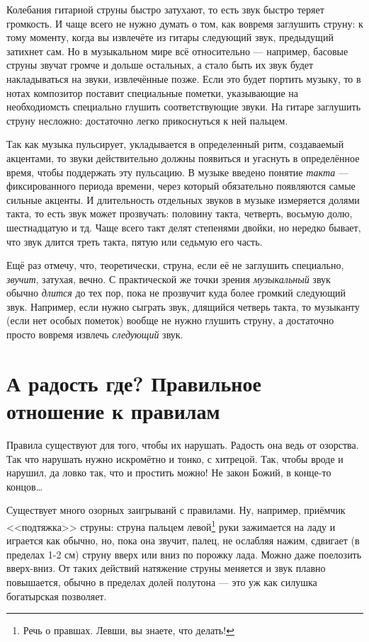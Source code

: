Колебания гитарной струны быстро затухают, то есть звук быстро теряет громкость. И чаще всего не нужно думать о том, как вовремя заглушить струну: к тому моменту, когда вы извлечёте из гитары следующий звук, предыдущий затихнет сам. Но в музыкальном мире всё относительно --- например, басовые струны звучат громче и дольше остальных, а стало быть их звук будет накладываться на звуки, извлечённые позже. Если это будет портить музыку, то в нотах композитор поставит специальные пометки, указывающие на необходиомсть специально глушить соответствующие звуки. На гитаре заглушить струну несложно: достаточно легко прикоснуться к ней пальцем.

Так как музыка пульсирует, укладывается в определенный ритм, создаваемый акцентами, то звуки действительно должны появиться и угаснуть в определённое время, чтобы поддержать эту пульсацию. В музыке введено понятие \emph{такта} --- фиксированного периода времени, через который обязательно появляются самые сильные акценты. И длительность отдельных звуков в музыке измеряется долями такта, то есть звук может прозвучать: половину такта, четверть, восьмую долю, шестнадцатую и тд. Чаще всего такт делят степенями двойки, но нередко бывает, что звук длится треть такта, пятую или седьмую его часть.

Ещё раз отмечу, что, теоретически, струна, если её не заглушить специально, \emph{звучит}, затухая, вечно. С практической же точки зрения \emph{музыкальный} звук обычно \emph{длится} до тех пор, пока не прозвучит куда более громкий следующий звук. Например, если нужно сыграть звук, длящийся четверь такта, то музыканту (если нет особых пометок) вообще не нужно глушить струну, а достаточно просто вовремя извлечь \emph{следующий} звук.


\section{А радость где? Правильное отношение к правилам}
\label{ch:music:rules}

Правила существуют для того, чтобы их нарушать. Радость она ведь от озорства. Так что нарушать нужно искромётно и тонко, с хитрецой. Так, чтобы вроде и нарушил, да ловко так, что и простить можно! Не закон Божий, в конце-то концов\ldots

Существует много озорных заигрыванй с правилами. Ну, например, приёмчик <<подтяжка>> струны: струна пальцем левой\footnote{Речь о правшах. Левши, вы знаете, что делать!} руки зажимается на ладу и играется как обычно, но, пока она звучит, палец, не ослабляя нажим, сдвигает (в пределах 1-2 см) струну вверх или вниз по порожку лада. Можно даже поелозить вверх-вниз. От таких действий натяжение струны меняется и звук плавно повышается, обычно в пределах долей полутона --- это уж как силушка богатырская позволяет.

